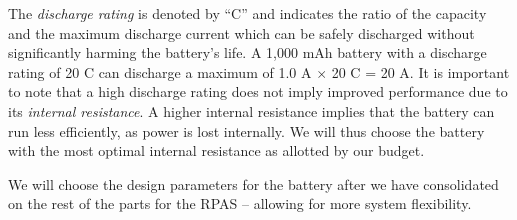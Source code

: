 The \textit{discharge rating} is denoted by ``C'' and indicates the ratio of the capacity and the maximum discharge current which can be  safely discharged without significantly harming the battery's life. A 1,000 mAh battery with a discharge rating of 20 C can discharge a maximum of 1.0 A $\times$ 20 C = 20 A. It is important to note that a high discharge rating does not imply improved performance due to its \textit{internal resistance}. A higher internal resistance implies that the battery can run less efficiently, as power is lost internally\cite{battery-c}. We will thus choose the battery with the most optimal internal resistance as allotted by our budget. 

We will choose the design parameters for the battery after we have consolidated on the rest of the parts for the RPAS -- allowing for more system flexibility. 
